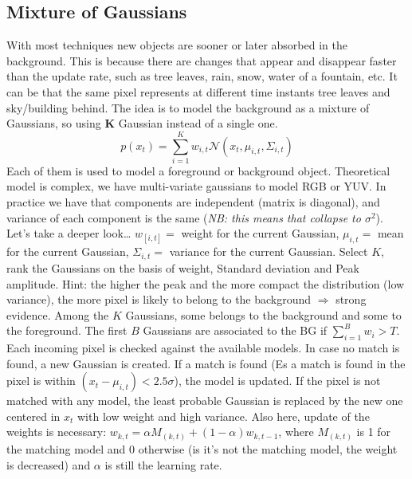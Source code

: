 \subsection{Mixture of Gaussians}
With most techniques new objects are sooner or later absorbed in the background. This is because there are changes that appear and disappear faster than the update rate, such as tree leaves, rain, snow, water of a fountain, etc.
It can be that the same pixel represents at different time instants tree leaves and sky/building behind.
The idea is to model the background as a mixture of Gaussians, so using \textbf{K} Gaussian instead of a single one. 
\[
    p(x_t) = \sum_{i=1}^{K} w_{i,t} \mathcal{N}(x_t, \mu_{i,t}, \Sigma_{i,t})
\]
Each of them is used to model a foreground or background object. Theoretical model is complex, we have multi-variate gaussians to model RGB or YUV. In practice we have that components are independent (matrix is diagonal), and variance of each component is the same (\textit{NB: this means that collapse to $\sigma^2$}).  
\\Let's take a deeper look\dots
$w_[i,t] = $ weight for the current Gaussian, $\mu_{i,t} = $ mean for the current Gaussian, $\Sigma_{i,t} = $ variance for the current Gaussian.
Select $K$, rank the Gaussians on the basis of weight, Standard deviation and Peak amplitude.
Hint: the higher the peak and the more compact the distribution (low variance), the more pixel is likely to belong to the background $\Rightarrow$ strong evidence.
Among the $K$ Gaussians, some belongs to the background and some to the foreground. The first $B$ Gaussians are associated to the BG if $\sum_{i=1}^B w_i > T$.
Each incoming pixel is checked against the available models. In case no match is found, a new Gaussian is created. If a match is found (Es a match is found in the pixel is within $(x_t - \mu_{i, t})<2.5\sigma$), the model is updated. If the pixel is not matched with any model, the least probable Gaussian is replaced by the new one centered in $x_t$ with low weight and high variance.  
Also here, update of the weights is necessary: $w_{k,t} = \alpha M_(k,t) + (1-\alpha)w_{k,t-1}$, where $M_(k,t)$ is 1 for the matching model and 0 otherwise (is it's not the matching model, the weight is decreased) and $\alpha$ is still the learning rate. 